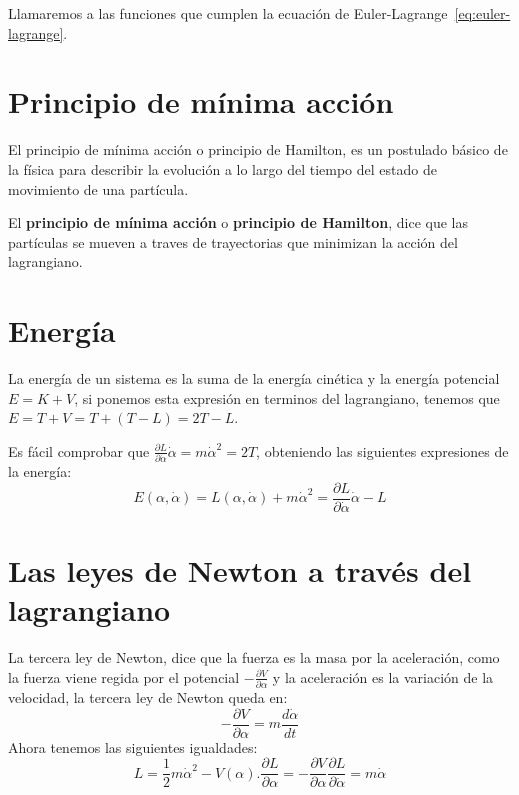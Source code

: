 \begin{definition}
    Llamaremos  a las funciones que cumplen la ecuación de Euler-Lagrange~\eqref{eq:euler-lagrange}.
\end{definition}


\section{Principio de mínima acción}

El principio de mínima acción o principio de Hamilton, es un postulado básico de la física para describir la evolución a lo largo del tiempo del estado de movimiento de una partícula.

El \textbf{principio de mínima acción} o \textbf{principio de Hamilton}, dice que las partículas se mueven a traves de trayectorias que minimizan la acción del lagrangiano.


\section{Energía}
La energía de un sistema es la suma de la energía cinética y la energía potencial $E=K+V$, si ponemos esta expresión en terminos del lagrangiano, tenemos que $E=T+V=T+(T-L)=2T-L$.

Es fácil comprobar que $\frac{\partial L}{\partial\dot{\alpha}}\dot{\alpha}=m\dot{\alpha}^2=2T$, obteniendo las siguientes expresiones de la energía:
\begin{equation}
    \label{eq:energia_lagrangiana}
    E(\alpha, \dot{\alpha})=L(\alpha, \dot{\alpha})+m\dot{\alpha}^2=\frac{\partial L}{\partial\dot{\alpha}}\dot{\alpha}-L
\end{equation}


\section{Las leyes de Newton a través del lagrangiano}
La tercera ley de Newton, dice que la fuerza es la masa por la aceleración, como la fuerza viene regida por el potencial $-\frac{\partial V}{\partial\alpha}$ y la aceleración es la variación de la velocidad, la tercera ley de Newton queda en:
\begin{equation*}
    -\frac{\partial V}{\partial\alpha} = m\frac{d\dot{\alpha}}{dt}
\end{equation*}
Ahora tenemos las siguientes igualdades:
\begin{subequations}
    \begin{equation*}
        L=\frac{1}{2}m\dot{\alpha}^2-V(\alpha).
    \end{equation*}
    \begin{equation*}
        \frac{\partial L}{\partial \alpha}=-\frac{\partial V}{\partial \alpha}
    \end{equation*}
    \begin{equation*}
        \frac{\partial L}{\partial\dot{\alpha}}=m\dot{\alpha}
    \end{equation*}
\end{subequations}


